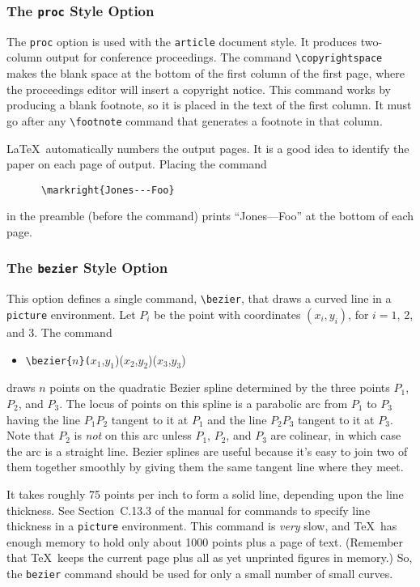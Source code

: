 \subsubsection{The \mbox{\tt proc} Style Option}
\label{se:procsty}

The \mbox{\tt proc} option is used with the \mbox{\tt article} document
style.  It produces two-column output for conference
proceedings.  The command \hbox{\verb|\copyrightspace|} makes the blank
space at the bottom of the first column of the first page, where the
proceedings editor will insert a copyright notice.  This command works
by producing a blank footnote, so it is placed in the text of the first
column.  It must go after any \hbox{\verb|\footnote|} command that
generates a footnote in that column.

\LaTeX\ automatically numbers the output pages.  It is a good idea 
to identify the paper on each page of output.  Placing the command
\begin{verbatim}
      \markright{Jones---Foo}
\end{verbatim}
in the preamble (before the \hbox{\verb||} command)
prints ``Jones---Foo'' at the bottom of each page.  

\subsubsection{The \mbox{\tt bezier} Style Option}
\label{se:beziersty}

This option defines a single command, \hbox{\verb|\bezier|}, that draws
a curved line in a \mbox{\tt picture} environment.  Let $P_{i}$ be the point
with coordinates $(x_{i},y_{i})$, for $i=1$, 2, and 3.  The command
\begin{itemize} \tt
\item[]
\verb|\bezier{|$n$\verb|}(|$x_{1}$,$y_{1}$)($x_{2}$,$y_{2}$)($x_{3}$,$y_{3}$)
\end{itemize}
draws $n$ points on the quadratic Bezier spline determined by the three
points $P_{1}$, $P_{2}$, and $P_{3}$.  The locus of points on this
spline is a parabolic arc from $P_{1}$ to $P_{3}$ having the line
$P_{1}P_{2}$ tangent to it at $P_{1}$ and the line $P_{2}P_{3}$ tangent
to it at $P_{3}$.  Note that $P_{2}$ is {\em not\/} on this arc unless
$P_{1}$, $P_{2}$, and $P_{3}$ are colinear, in which case the arc is a
straight line.  Bezier splines are useful because it's easy to join two
of them together smoothly by giving them the same tangent line where
they meet.

It takes roughly 75 points per inch to form a solid line, depending
upon the line thickness.  See Section~C.13.3 of the manual for commands
to specify line thickness in a \mbox{\tt picture} environment.  This command
is {\em very\/} slow, and \TeX\ has enough memory to hold only about
1000 points plus a page of text.  (Remember that \TeX\ keeps the
current page plus all as yet unprinted figures in memory.) So, the
\verb|bezier| command should be used for only a small number of small
curves.

